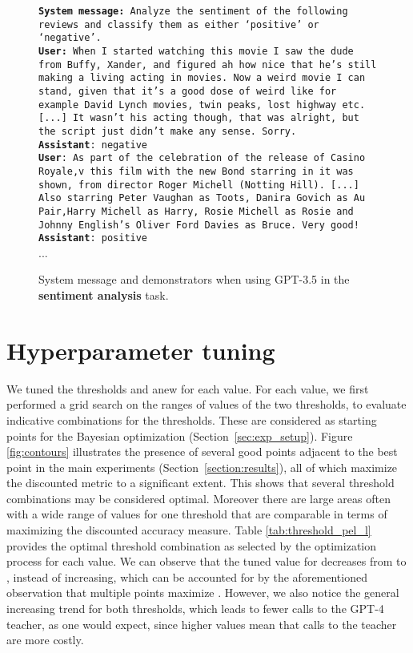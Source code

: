 \documentclass[11pt]{article}
\begin{document}
\begin{figure}[!htb]
\scriptsize
\begin{minipage}{\columnwidth}
\small\texttt{{\textbf{System message:} Analyze the sentiment of the following reviews and classify them as either `positive' or `negative'.
}}\\

{\small\texttt{\textbf{User:} When I started watching this movie I saw the dude 
from Buffy, Xander, and figured ah how nice that he's still making a living acting in movies. Now a weird movie I can stand, given that it's a good dose of weird like for example David Lynch movies, twin peaks, lost highway etc.  [...] It wasn't his acting though, that was alright, but the script just didn't make any sense. Sorry.}}\\
{\small\texttt{\textbf{Assistant}: negative}}\\

{\small\texttt{\textbf{User}: As part of the celebration of the release of Casino Royale,v this film with the new Bond starring in it was shown, from director Roger Michell (Notting Hill). [...] Also starring Peter Vaughan as Toots, Danira Govich as Au Pair,Harry Michell as Harry, Rosie Michell as Rosie and Johnny English's Oliver Ford Davies as Bruce. 
Very good!}}\\
{\small\texttt{\textbf{Assistant}: positive}}\\
...
\end{minipage}
\vspace*{-2mm}
\caption{System message and demonstrators when using GPT-3.5 in the \textbf{sentiment analysis} task.}
\vspace*{-6mm}
\label{fig:sentiment_prompt}
\end{figure}


\section{Hyperparameter tuning} \label{sec:tuning}
We tuned the thresholds  and   anew for each  value. For each  value, we first performed a  grid search on the ranges of values of the two thresholds, to evaluate indicative combinations for the thresholds. These are considered as starting points for the Bayesian optimization (Section~\ref{sec:exp_setup}). 
Figure \ref{fig:contours} illustrates the presence of several good points adjacent to the best point in the main experiments (Section~\ref{section:results}), all of which maximize the discounted metric to a significant extent. This shows that several threshold combinations may be considered optimal. Moreover there are large areas often with a wide range of values for one threshold that are comparable in terms of maximizing the discounted accuracy measure. Table \ref{tab:threshold_pel_l} provides the optimal threshold combination as selected by the optimization process for each  value. We can observe that the tuned value for  decreases from  to , instead of increasing, which can be accounted for by the aforementioned observation that multiple points maximize . However, we also notice the general increasing trend for both thresholds, which leads to fewer calls to the GPT-4 teacher, as one would expect, since higher  values mean that calls to the teacher are more costly.
\end{document}
